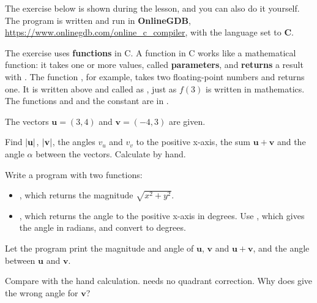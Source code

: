 The exercise below is shown during the lesson, and you can also do it yourself. The program is
written and run in \textbf{OnlineGDB}, \url{https://www.onlinegdb.com/online_c_compiler}, with the
language set to \textbf{C}.

The exercise uses \textbf{functions} in C. A function in C works like a mathematical function: it
takes one or more values, called \textbf{parameters}, and \textbf{returns} a result with
. The function , for example, takes two
floating-point numbers and returns one. It is written above  and called as
, just as $f(3)$ is written in mathematics. The functions 
and  and the constant  are in .

The vectors $\mathbf{u} = (3, 4)$ and $\mathbf{v} = (-4, 3)$ are given.
\begin{parts}
  \item Find $\lvert\mathbf{u}\rvert$, $\lvert\mathbf{v}\rvert$, the angles $v_u$ and $v_v$ to the positive
    x-axis, the sum $\mathbf{u} + \mathbf{v}$ and the angle $\alpha$ between the vectors.
    Calculate by hand.
  \item Write a program with two functions:
    \begin{itemize}
      \item {}, which returns the magnitude
        $\sqrt{x^2 + y^2}$.
      \item {}, which returns the angle to the positive
        x-axis in degrees. Use , which gives the angle in radians, and convert
        to degrees.
    \end{itemize}
    Let the program print the magnitude and angle of $\mathbf{u}$, $\mathbf{v}$ and
    $\mathbf{u} + \mathbf{v}$, and the angle between $\mathbf{u}$ and $\mathbf{v}$.
  \item Compare with the hand calculation.  needs no quadrant correction. Why does
     give the wrong angle for $\mathbf{v}$?
\end{parts}
